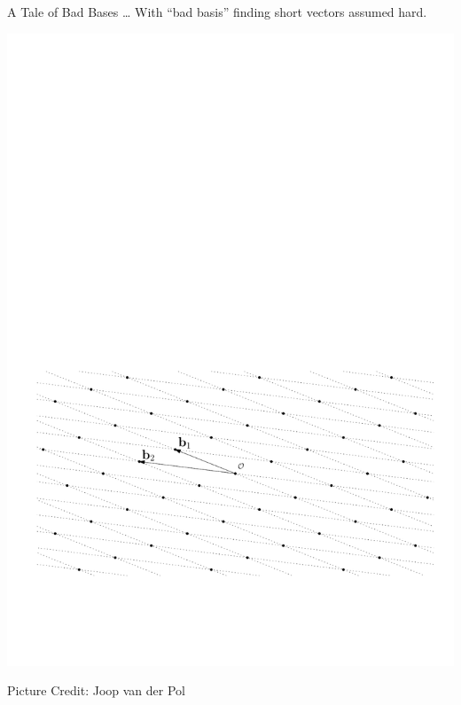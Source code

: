 \documentclass[xcolor=table,10pt,aspectratio=169]{beamer}
\begin{document}
\begin{frame}[label={sec:orgdb8c34e}]{A Tale of Bad Bases …}
With “bad basis” finding short vectors assumed hard.

\begin{center}
\includegraphics[width=0.8\linewidth]{./joop-latt2a.pdf}
\end{center}

\tiny Picture Credit: Joop van der Pol
\end{frame}
\end{document}
